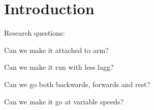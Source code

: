 \section{Introduction}
\label{section:intro}



Research questions:

Can we make it attached to arm?

Can we make it run with less lagg?

Can we go both backwards, forwards and rest?

Can we make it go at variable speeds?
